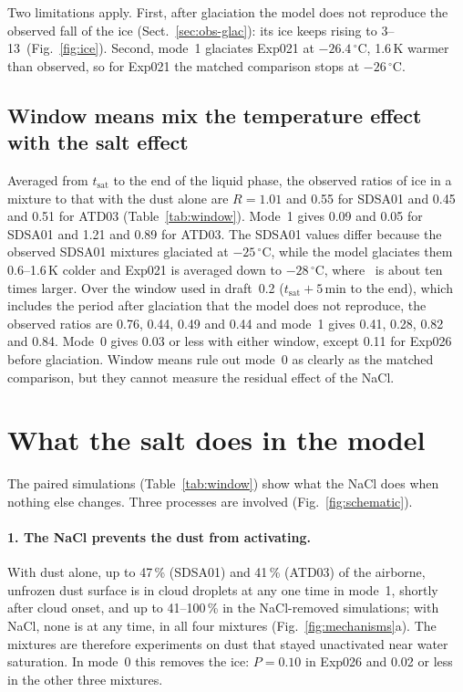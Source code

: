 Two limitations apply. First, after glaciation the model does not reproduce the observed fall of the ice (Sect.~\ref{sec:obs-glac}): its ice keeps rising to 3--13\cmc\ (Fig.~\ref{fig:ice}). Second, mode~1 glaciates Exp021 at $-26.4\,^\circ$C, 1.6\,K warmer than observed, so for Exp021 the matched comparison stops at $-26\,^\circ$C.

\subsection{Window means mix the temperature effect with the salt effect}\label{sec:window}

Averaged from $t_\mathrm{sat}$ to the end of the liquid phase, the observed ratios of ice in a mixture to that with the dust alone are $R = 1.01$ and 0.55 for SDSA01 and 0.45 and 0.51 for ATD03 (Table~\ref{tab:window}). Mode~1 gives 0.09 and 0.05 for SDSA01 and 1.21 and 0.89 for ATD03. The SDSA01 values differ because the observed SDSA01 mixtures glaciated at $-25\,^\circ$C, while the model glaciates them 0.6--1.6\,K colder and Exp021 is averaged down to $-28\,^\circ$C, where \ns\ is about ten times larger. Over the window used in draft~0.2 ($t_\mathrm{sat}+5$\,min to the end), which includes the period after glaciation that the model does not reproduce, the observed ratios are 0.76, 0.44, 0.49 and 0.44 and mode~1 gives 0.41, 0.28, 0.82 and 0.84. Mode~0 gives 0.03 or less with either window, except 0.11 for Exp026 before glaciation. Window means rule out mode~0 as clearly as the matched comparison, but they cannot measure the residual effect of the NaCl.

\section{What the salt does in the model}\label{sec:mech}

The paired simulations (Table~\ref{tab:window}) show what the NaCl does when nothing else changes. Three processes are involved (Fig.~\ref{fig:schematic}).

\paragraph{1. The NaCl prevents the dust from activating.} With dust alone, up to 47\,\% (SDSA01) and 41\,\% (ATD03) of the airborne, unfrozen dust surface is in cloud droplets at any one time in mode~1, shortly after cloud onset, and up to 41--100\,\% in the NaCl-removed simulations; with NaCl, none is at any time, in all four mixtures (Fig.~\ref{fig:mechanisms}a). The mixtures are therefore experiments on dust that stayed unactivated near water saturation. In mode~0 this removes the ice: $P = 0.10$ in Exp026 and 0.02 or less in the other three mixtures.

